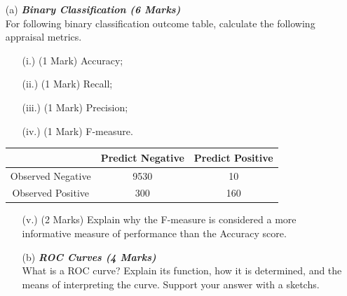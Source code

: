 \documentclass[a4paper,12pt]{article}
\begin{document}
\begin{itemize}
	\item[(a)] \textbf{\textit{Binary Classification (6 Marks)}}\\
	For following binary classification outcome table, calculate the following appraisal metrics.
	\begin{itemize}	
		\item[(i.)] (1 Mark)	Accuracy;
		\item[(ii.)] (1 Mark)	Recall;
		\item[(iii.)] (1 Mark)	Precision;
		\item[(iv.)] (1 Mark)	F-measure.
	\end{itemize}	
	\vspace{-0.6cm}
		\begin{center}
		\begin{tabular}{|c|c|c|}
			\hline  & \phantom{spa}Predict Negative\phantom{spa} & \phantom{spa}Predict Positive\phantom{spa} \\ 
			\hline\phantom{spa} Observed Negative \phantom{spa}&	9530	&	10	\\ 
			\hline \phantom{spa}Observed Positive\phantom{spa} & 	300	&	160	\\ 
			\hline 
		\end{tabular} 
	\end{center}
	
	\begin{itemize}	
		\item[(v.)] (2 Marks) Explain why the F-measure is considered a more informative measure of performance than the Accuracy score.
	
	\end{itemize}
	\newpage
\begin{itemize}
	\item[(b)]  \textbf{\textit{ROC Curves	(4 Marks) }}\\
		What is a ROC curve? Explain its function, how it is determined, and the means of interpreting the curve. Support your answer with a sketchs.
\end{itemize}
\end{itemize}


\newpage


\end{document}
